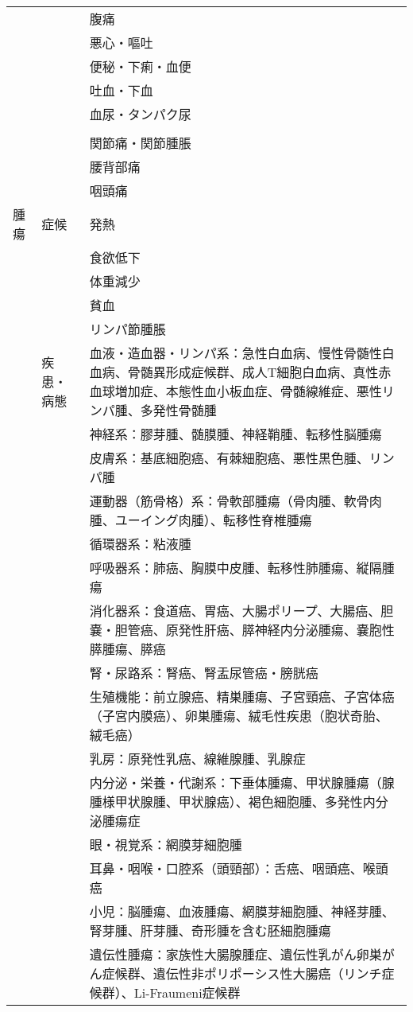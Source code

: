 \documentclass[
]{ltjsarticle}
\begin{document}
\begin{xltabular}{\linewidth}{XXX}
 &  & 腹痛 \\
 &  & 悪心・嘔吐 \\
 &  & 便秘・下痢・血便 \\
 &  & 吐血・下血 \\
 &  & 血尿・タンパク尿 \\
 &  &  \\
 &  & 関節痛・関節腫脹 \\
 &  & 腰背部痛 \\
 &  & 咽頭痛 \\
腫瘍 & 症候 & 発熱 \\
 &  & 食欲低下 \\
 &  & 体重減少 \\
 &  & 貧血 \\
 &  & リンパ節腫脹 \\
 & 疾患・病態 & 血液・造血器・リンパ系：急性白血病、慢性骨髄性白血病、骨髄異形成症候群、成人T細胞白血病、真性赤血球増加症、本態性血小板血症、骨髄線維症、悪性リンパ腫、多発性骨髄腫 \\
 &  & 神経系：膠芽腫、髄膜腫、神経鞘腫、転移性脳腫瘍 \\
 &  & 皮膚系：基底細胞癌、有棘細胞癌、悪性黒色腫、リンパ腫 \\
 &  & 運動器（筋骨格）系：骨軟部腫瘍（骨肉腫、軟骨肉腫、ユーイング肉腫）、転移性脊椎腫瘍 \\
 &  & 循環器系：粘液腫 \\
 &  & 呼吸器系：肺癌、胸膜中皮腫、転移性肺腫瘍、縦隔腫瘍 \\
 &  & 消化器系：食道癌、胃癌、大腸ポリープ、大腸癌、胆嚢・胆管癌、原発性肝癌、膵神経内分泌腫瘍、嚢胞性膵腫瘍、膵癌 \\
 &  & 腎・尿路系：腎癌、腎盂尿管癌・膀胱癌 \\
 &  & 生殖機能：前立腺癌、精巣腫瘍、子宮頸癌、子宮体癌（子宮内膜癌）、卵巣腫瘍、絨毛性疾患（胞状奇胎、絨毛癌） \\
 &  & 乳房：原発性乳癌、線維腺腫、乳腺症 \\
 &  & 内分泌・栄養・代謝系：下垂体腫瘍、甲状腺腫瘍（腺腫様甲状腺腫、甲状腺癌）、褐色細胞腫、多発性内分泌腫瘍症 \\
 &  & 眼・視覚系：網膜芽細胞腫 \\
 &  & 耳鼻・咽喉・口腔系（頭頸部）：舌癌、咽頭癌、喉頭癌 \\
 &  & 小児：脳腫瘍、血液腫瘍、網膜芽細胞腫、神経芽腫、腎芽腫、肝芽腫、奇形腫を含む胚細胞腫瘍 \\
 &  & 遺伝性腫瘍：家族性大腸腺腫症、遺伝性乳がん卵巣がん症候群、遺伝性非ポリポーシス性大腸癌（リンチ症候群）、Li-Fraumeni症候群 \\

\end{xltabular}
\end{document}
